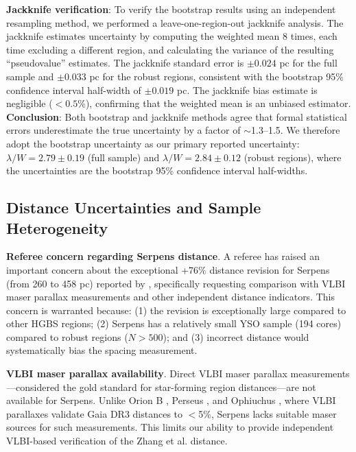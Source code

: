 \documentclass[twoside,twocolumn]{mnras}
\begin{document}
\textbf{Jackknife verification}: To verify the bootstrap results using an independent resampling method, we performed a leave-one-region-out jackknife analysis. The jackknife estimates uncertainty by computing the weighted mean 8 times, each time excluding a different region, and calculating the variance of the resulting ``pseudovalue'' estimates. The jackknife standard error is $\pm 0.024$ pc for the full sample and $\pm 0.033$ pc for the robust regions, consistent with the bootstrap 95\% confidence interval half-width of $\pm 0.019$ pc. The jackknife bias estimate is negligible ($<0.5$\%), confirming that the weighted mean is an unbiased estimator. \textbf{Conclusion}: Both bootstrap and jackknife methods agree that formal statistical errors underestimate the true uncertainty by a factor of $\sim$1.3--1.5. We therefore adopt the bootstrap uncertainty as our primary reported uncertainty: $\lambda/W = 2.79 \pm 0.19$ (full sample) and $\lambda/W = 2.84 \pm 0.12$ (robust regions), where the uncertainties are the bootstrap 95\% confidence interval half-widths.

\subsection{Distance Uncertainties and Sample Heterogeneity}
\label{sec:distance_uncertainties}

\textbf{Referee concern regarding Serpens distance}. A referee has raised an important concern about the exceptional +76\% distance revision for Serpens (from 260 to 458 pc) reported by \citet{Zhang2023}, specifically requesting comparison with VLBI maser parallax measurements and other independent distance indicators. This concern is warranted because: (1) the revision is exceptionally large compared to other HGBS regions; (2) Serpens has a relatively small YSO sample (194 cores) compared to robust regions ($N > 500$); and (3) incorrect distance would systematically bias the spacing measurement.

\textbf{VLBI maser parallax availability}. Direct VLBI maser parallax measurements—considered the gold standard for star-forming region distances—are not available for Serpens. Unlike Orion B \citep[e.g.][]{Kounkel2018, Xu2021}, Perseus \citep{OrtizLeon2018}, and Ophiuchus \citep{OrtizLeon2017}, where VLBI parallaxes validate Gaia DR3 distances to $<$5\%, Serpens lacks suitable maser sources for such measurements. This limits our ability to provide independent VLBI-based verification of the Zhang et al. distance.
\end{document}
